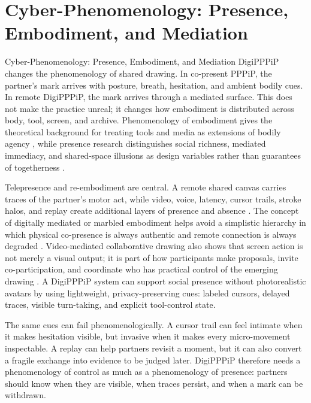 \documentclass[
  ignorenonframetext,
]{beamer}
\author{\texorpdfstring{}{}}
\date{}
\begin{document}
\section{Cyber-Phenomenology: Presence, Embodiment, and
Mediation}\label{sec:phenomenology}

\begin{frame}[allowframebreaks]{Cyber-Phenomenology: Presence,
Embodiment, and Mediation}
DigiPPPiP changes the phenomenology of shared drawing. In co-present
PPPiP, the partner's mark arrives with posture, breath, hesitation, and
ambient bodily cues. In remote DigiPPPiP, the mark arrives through a
mediated surface. This does not make the practice unreal; it changes how
embodiment is distributed across body, tool, screen, and archive.
Phenomenology of embodiment gives the theoretical background for
treating tools and media as extensions of bodily agency
, while presence research
distinguishes social richness, mediated immediacy, and shared-space
illusions as design variables rather than guarantees of togetherness
.

Telepresence and re-embodiment are central. A remote shared canvas
carries traces of the partner's motor act, while video, voice, latency,
cursor trails, stroke halos, and replay create additional layers of
presence and absence . The concept of digitally mediated or marbled
embodiment helps avoid a simplistic hierarchy in which physical
co-presence is always authentic and remote connection is always degraded
. Video-mediated collaborative drawing also
shows that screen action is not merely a visual output; it is part of
how participants make proposals, invite co-participation, and coordinate
who has practical control of the emerging drawing
. A DigiPPPiP system can support social
presence without photorealistic avatars by using lightweight,
privacy-preserving cues: labeled cursors, delayed traces, visible
turn-taking, and explicit tool-control state.

The same cues can fail phenomenologically. A cursor trail can feel
intimate when it makes hesitation visible, but invasive when it makes
every micro-movement inspectable. A replay can help partners revisit a
moment, but it can also convert a fragile exchange into evidence to be
judged later. DigiPPPiP therefore needs a phenomenology of control as
much as a phenomenology of presence: partners should know when they are
visible, when traces persist, and when a mark can be withdrawn.


\end{frame}
\end{document}
